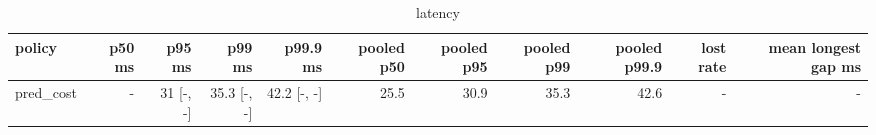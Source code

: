 \begin{table}[t]\centering\small
\begin{tabular}{lrrrrrrrrrr}\toprule
policy & p50 ms & p95 ms & p99 ms & p99.9 ms & pooled p50 & pooled p95 & pooled p99 & pooled p99.9 & lost rate & mean longest gap ms \\\midrule
pred\_cost & - & 31 [-, -] & 35.3 [-, -] & 42.2 [-, -] & 25.5 & 30.9 & 35.3 & 42.6 & - & - \\
\bottomrule\end{tabular}\caption{latency}\end{table}
